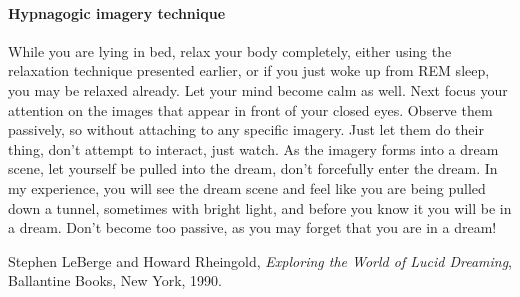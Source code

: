 \documentclass{article}
\begin{document}
\paragraph{Hypnagogic imagery technique} While you are lying in bed, relax your body completely, either using the relaxation technique presented earlier, or if you just woke up from REM sleep, you may be relaxed already. Let your mind become calm as well. Next focus your attention on the images that appear in front of your closed eyes. Observe them passively, so without attaching to any specific imagery. Just let them do their thing, don't attempt to interact, just watch. As the imagery forms into a dream scene, let yourself be pulled into the dream, don't forcefully enter the dream. In my experience, you will see the dream scene and feel like you are being pulled down a tunnel, sometimes with bright light, and before you know it you will be in a dream. Don't become too passive, as you may forget that you are in a dream!




\newpage
\begin{thebibliography}{9}

  Stephen LeBerge and Howard Rheingold,
  \textit{Exploring the World of Lucid Dreaming},
  Ballantine Books, New York,
  1990.

\end{thebibliography}
\end{document}
